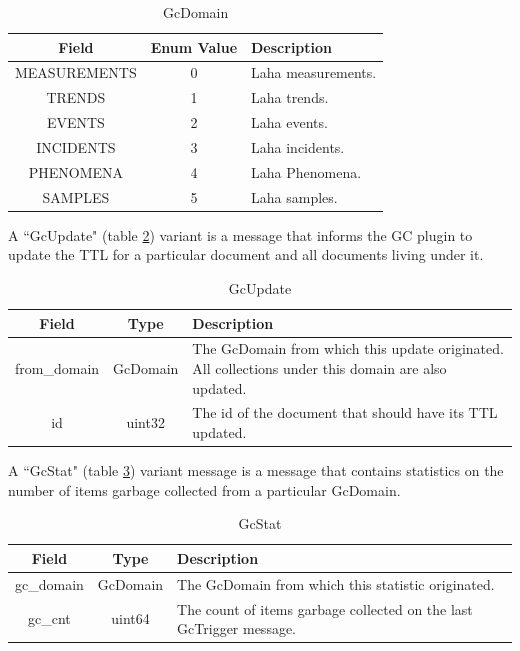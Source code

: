 \begin{table}[H]
	\centering
	\caption{GcDomain}
	\begin{tabular}{|c|c| p{8cm} |}
		\hline 
		Field & Enum Value & Description  \\ 
		\hline 
		MEASUREMENTS & 0 & Laha measurements.  \\ 
		\hline 
		TRENDS & 1 & Laha trends. \\ 
		\hline
		EVENTS & 2 & Laha events. \\
		\hline 
		INCIDENTS & 3 & Laha incidents. \\ 
		\hline
		PHENOMENA & 4 & Laha Phenomena. \\
		\hline
		SAMPLES & 5 & Laha samples. \\
		\hline 
	\end{tabular} 
	\label{table:GcDomain}
\end{table}

A ``GcUpdate" (table \ref{table:GcUpdate}) variant is a message that informs the GC plugin to update the TTL for a particular document and all documents living under it. 

\begin{table}[H]
	\centering
	\caption{GcUpdate}
	\begin{tabular}{|c|c|p{8cm}|}
		\hline 
		Field & Type & Description  \\ 
		\hline
		from\_domain & GcDomain & The GcDomain from which this update originated. All collections under this domain are also updated.  \\
		\hline
		id & uint32 & The id of the document that should have its TTL updated. \\
		\hline
	\end{tabular} 
	\label{table:GcUpdate}
\end{table}

A ``GcStat" (table \ref{table:GcStat}) variant message is a message that contains statistics on the number of items garbage collected from a particular GcDomain.

\begin{table}[H]
	\centering
	\caption{GcStat}
	\begin{tabular}{|c|c|p{8cm}|}
		\hline 
		Field & Type & Description  \\ 
		\hline
		gc\_domain & GcDomain & The GcDomain from which this statistic originated. \\
		\hline
		gc\_cnt & uint64 & The count of items garbage collected on the last GcTrigger message.  \\
		\hline
	\end{tabular} 
	\label{table:GcStat}
\end{table}

